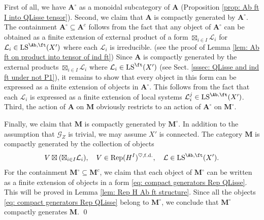 \documentclass[10pt]{amsart}
\theoremstyle{remark}
\newcommand{\on}{\operatorname}
\newcommand{\cG}{\mathcal{G}}
\newcommand{\cL}{\mathcal{L}}
\newcommand{\Rep}{\on{Rep}}
\newcommand{\LS}{\on{LS}}
\newcommand{\bA}{\mathbf{A}}
\newcommand{\bM}{\mathbf{M}}
\begin{document}
        First of all, we have $\bA^{\circ}$ as a monoidal subcategory of $\bA$ (Proposition \ref{prop: Ab ft I into QLisse tensor}). Second, we claim that $\bA$ is compactly generated by $\bA^{\circ}$. The containment $\bA^{\circ}\subseteq \bA^c$ follows from the fact that any object of $\bA^{\circ}$ can be obtained as a finite extension of external product of a form $\boxtimes_{i\in I}\cL_i$ for $\cL_i\in \LS^{\Ab,\ft}(X')$ where each $\cL_i$ is irreducible. (see the proof of Lemma \ref{lem: Ab ft on product into tensor of ind ft}) Since $\bA$ is compactly generated by the external products $\boxtimes_{i\in I}\cL_i$ where $\cL_i\in \LS^{\ft}(X')$ (see Sect. \ref{sssec: QLisse and ind ft under not P1}), it remains to show that every object in this form can be expressed as a finite extension of objects in $\bA^{\circ}$. This follows from the fact that each $\cL_i$ is expressed as a finite extension of local systems $\cL^j_i\in\LS^{\Ab,\ft}(X')$. Third, the action of $\bA$ on $\bM$ obviously restricts to an action of $\bA^{\circ}$ on $\bM^{\circ}$.
        \medskip

        Finally, we claim that $\bM$ is compactly generated by $\bM^{\circ}$. In addition to the assumption that $\cG_Z$ is trivial, we may assume $X'$ is connected.
        The category $\bM$ is compactly generated by the collection of objects
        \begin{equation}\label{eq: compact generators Rep QLisse}
            V\boxtimes (\boxtimes_{i\in I} \cL_i),\quad V\in\Rep(H^I)^{\heartsuit,\on{f.d.}},\quad \cL\in \LS^{\Ab,\ft}(X').
        \end{equation}
        For the containment $\bM^{\circ}\subseteq \bM^c$, we claim that each object of $\bM^{\circ}$ can be written as a finite extension of objects in a form \eqref{eq: compact generators Rep QLisse}. This will be proved in Lemma \ref{lem: Rep H Ab ft structure}. Since all the objects \eqref{eq: compact generators Rep QLisse} belong to $\bM^{\circ}$, we conclude that $\bM^{\circ}$ compactly generates $\bM$. \qed
\end{document}
